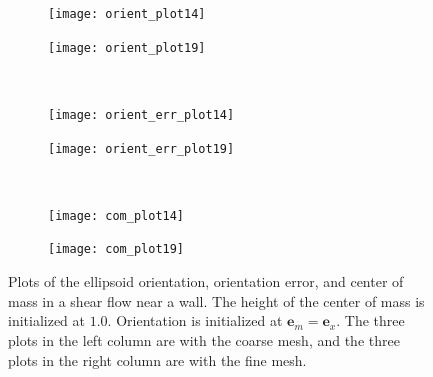 \documentclass{article}
\newcommand{\vect}[1]{\boldsymbol{\mathbf{#1}}}
\begin{document}
\begin{figure}
  \centering
  \begin{subfigure}{0.49\textwidth}
    \texttt{[image: orient\_plot14]}
  \end{subfigure}
  \hfill
  \begin{subfigure}{0.49\textwidth}
    \texttt{[image: orient\_plot19]}
  \end{subfigure}
  \\
  \begin{subfigure}{0.49\textwidth}
    \texttt{[image: orient\_err\_plot14]}
  \end{subfigure}
  \hfill
  \begin{subfigure}{0.49\textwidth}
    \texttt{[image: orient\_err\_plot19]}
  \end{subfigure}
  \\
  \begin{subfigure}{0.49\textwidth}
    \texttt{[image: com\_plot14]}
  \end{subfigure}
  \hfill
  \begin{subfigure}{0.49\textwidth}
    \texttt{[image: com\_plot19]}
  \end{subfigure}
  \caption{Plots of the ellipsoid orientation, orientation error, and
    center of mass in a shear flow near a wall. The height of the
    center of mass is initialized at $1.0$. Orientation is initialized
    at $\vect{e}_m = \vect{e}_x$. The three plots in the left column
    are with the coarse mesh, and the three plots in the right column
    are with the fine mesh.}
  \label{fig:third-wall-test}
\end{figure}



\end{document}
